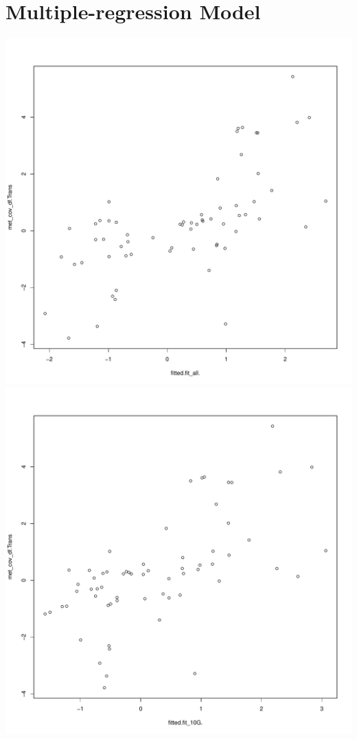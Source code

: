 \documentclass{article}\usepackage[]{graphicx}\usepackage[]{color}
\newenvironment{knitrout}{}{} %
\begin{document}
\section{Multiple-regression Model}
\begin{knitrout}
\color{fgcolor}

{\centering \includegraphics[width=.9\linewidth]{figure/minimal-heat_fitted_model-1} 
\includegraphics[width=.9\linewidth]{figure/minimal-heat_fitted_model-2} 
}
\end{knitrout}
\end{document}
